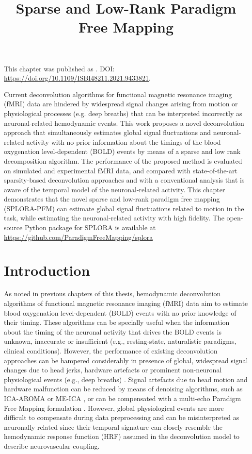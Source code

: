\title{Sparse and Low-Rank Paradigm Free Mapping}
\label{cha:low-rank}

\begin{framed}\noindent This chapter was published as
    . DOI:
    \url{https://doi.org/10.1109/ISBI48211.2021.9433821}.
\end{framed}

Current deconvolution algorithms for functional magnetic resonance imaging
(fMRI) data are hindered by widespread signal changes arising from motion or
physiological processes (e.g. deep breaths) that can be interpreted incorrectly
as neuronal-related hemodynamic events. This work proposes a novel deconvolution
approach that simultaneously estimates global signal fluctuations and
neuronal-related activity with no prior information about the timings of the
blood oxygenation level-dependent (BOLD) events by means of a sparse and low
rank decomposition algorithm. The performance of the proposed method is
evaluated on simulated and experimental fMRI data, and compared with
state-of-the-art sparsity-based deconvolution approaches and with a conventional
analysis that is aware of the temporal model of the neuronal-related activity.
This chapter demonstrates that the novel sparse and low-rank paradigm free mapping (SPLORA-PFM) can estimate global
signal fluctuations related to motion in the task, while estimating the
neuronal-related activity with high fidelity. The open-source Python package for
SPLORA is available at
\url{https://github.com/ParadigmFreeMapping/splora}


\section{Introduction}
\label{sec:low_rank_intro}

As noted in previous chapters of this thesis, hemodynamic deconvolution
algorithms of functional magnetic resonance imaging (fMRI) data aim to estimate
blood oxygenation level-dependent (BOLD) events with no prior knowledge of their
timing. These algorithms can be specially useful when the information about the
timing of the neuronal activity that drives the BOLD events is unknown,
inaccurate or insufficient (e.g., resting-state, naturalistic paradigms,
clinical conditions). However, the performance of existing deconvolution
approaches can be hampered considerably in presence of global, widespread signal
changes due to head jerks, hardware artefacts or prominent non-neuronal
physiological events (e.g., deep breaths)
\citep{Power2017Sourcesimplicationswhole}. Signal artefacts due to head motion
and hardware malfunction can be reduced by means of denoising algorithms, such
as ICA-AROMA \citep{Pruim2015ICAAROMArobust} or ME-ICA
\citep{Kundu2012DifferentiatingBOLDnon}, or can be compensated with a multi-echo
Paradigm Free Mapping formulation
\citep{CaballeroGaudes2019deconvolutionalgorithmmulti}. However, global
physiological events are more difficult to compensate during data preprocessing
\citep{Power2018RiddingfMRIdata} and can be misinterpreted as neuronally related
since their temporal signature can closely resemble the hemodynamic response
function (HRF) assumed in the deconvolution model to describe neurovascular
coupling.

